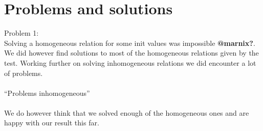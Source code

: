 \documentclass{article}
\begin{document}
\section{Problems and solutions}
Problem 1:\\
Solving a homogeneous relation for some init values was impossible \textbf{@marnix?}. We did however find solutions to most of the homogeneous relations given by the test. Working further on solving inhomogeneous relations we did encounter a lot of problems.
\\
\\
``Problems inhomogeneous''
\\
\\
We do however think that we solved enough of the homogeneous ones and are happy with our result this far.
\end{document}
